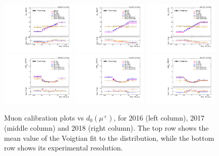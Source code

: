 \begin{figure}[!htb]
      \centering
      \captionsetup{justification=justified}
      \includegraphics[width=0.32\textwidth]{pics/muon_corr/muon_cal/2016/muP_d0_rebin_summary_mean.pdf}
      \includegraphics[width=0.32\textwidth]{pics/muon_corr/muon_cal/2017/muP_d0_rebin_summary_mean.pdf}
      \includegraphics[width=0.32\textwidth]{pics/muon_corr/muon_cal/2018/muP_d0_rebin_summary_mean.pdf}
      \includegraphics[width=0.32\textwidth]{pics/muon_corr/muon_cal/2016/muP_d0_rebin_summary_reso.pdf}
      \includegraphics[width=0.32\textwidth]{pics/muon_corr/muon_cal/2017/muP_d0_rebin_summary_reso.pdf}
      \includegraphics[width=0.32\textwidth]{pics/muon_corr/muon_cal/2018/muP_d0_rebin_summary_reso.pdf}
      \caption{Muon calibration plots vs $d_0(\mu^{+})$, for 2016 (left column), 2017 (middle column) and 2018 (right column).
               The top row shows the mean value of the Voigtian fit to the \mmm distribution, 
               while the bottom row shows its experimental resolution.}
      \label{fig:mucal_muP_d0}
\end{figure}


